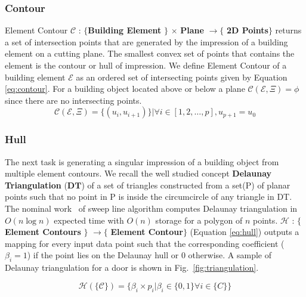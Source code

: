 \documentclass[conference]{IEEEtran}
\begin{document}
\subsubsection{Contour}

{Element Contour $\mathcal{C}$} : $\{$\textbf{Building Element} $\}$ $\times$ \textbf{Plane} $\rightarrow \{$ \textbf{2D Points}$ \}$ returns a set of intersection points that are generated by the impression of a building element on a cutting plane. The smallest convex set of points that contains the element is the contour or hull of impression. We define Element Contour of a building element $\mathcal{E}$ as an ordered set of intersecting points given by Equation \ref{eq:contour}. For a building object located above or below a plane $\mathcal{C}(\mathcal{E}, \Xi) = \phi$ since there are no intersecting points.
\begin{equation}
    \mathcal{C}(\mathcal{E}, \Xi) = \{ (u_i,u_{i+1}) \} | \forall i \in [1,2,\dots, p],  u_{p+1}=u_0
    \label{eq:contour}
\end{equation}



\subsubsection{Hull }

The next task is generating a singular impression of a building object from multiple element contours. We recall the well studied concept \textbf{Delaunay Triangulation} ($\mathbf{DT}$) of a set of triangles constructed from a set(P) of planar points such that no point in P is inside the circumcircle of any triangle in DT. The nominal work~\cite{shamos1976geometric} of sweep line algorithm computes Delaunay triangulation in $O(n\log n)$ expected time with $O(n)$ storage for a polygon of $n$ points.  $\mathcal{H}$ : $\{$\textbf{Element Contours} $\}$ $\rightarrow \{$ \textbf{Element Contour}$ \}$ (Equation \ref{eq:hull}) outputs a mapping for every input data point such that the corresponding coefficient ($\beta_i = 1$) if the point lies on the Delaunay hull or 0 otherwise. A sample of Delaunay triangulation for a door is shown in Fig.~\ref{fig:triangulation}.



\begin{equation}
\mathcal{H}(\{\mathcal{C}\}) = \{  \beta_i \times p_i | \beta_i \in \{0,1\} \forall {i \in\{C\}}  \}
\label{eq:hull}
\end{equation} 
\end{document}
